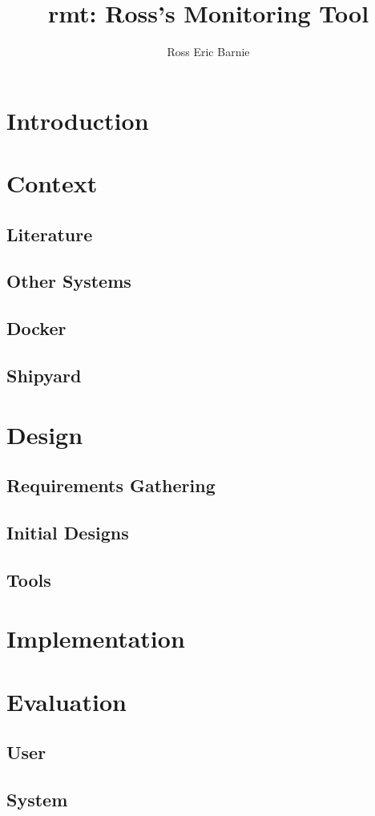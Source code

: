 \documentclass{l4proj}
\title{rmt: Ross's Monitoring Tool}
\author{Ross Eric Barnie}
\begin{document}
\maketitle
\tableofcontents

\chapter{Introduction}


\chapter{Context}
\section{Literature}
\section{Other Systems}
\section{Docker}
\section{Shipyard}

\chapter{Design}
\section{Requirements Gathering}
\section{Initial Designs}
\label{sec:initial_designs}
\section{Tools}

\chapter{Implementation}

\chapter{Evaluation}
\section{User}
\section{System}



\end{document}
